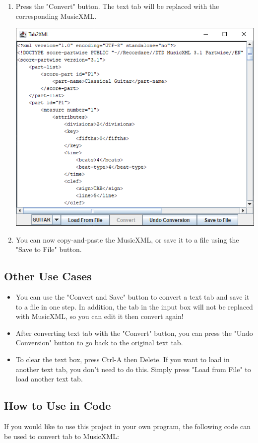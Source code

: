\documentclass[11pt]{article}
\begin{document}
\begin{enumerate}
\begin{center}
\end{center}
\item Press the "Convert" button.  The text tab will be replaced with the corresponding MusicXML.
\begin{center}
\includegraphics[width=.9\linewidth]{../Screenshots/converted-20210217.png}
\end{center}
\item You can now copy-and-paste the MusicXML, or save it to a file using the "Save to File" button.
\end{enumerate}
\subsection{Other Use Cases}
\label{sec:orge94bb2c}
\begin{itemize}
\item You can use the "Convert and Save" button to convert a text tab and save it to a file in one step.  In addition, the tab in the input box will not be replaced with MusicXML, so you can edit it then convert again!
\item After converting text tab with the "Convert" button, you can press the "Undo Conversion" button to go back to the original text tab.
\item To clear the text box, press Ctrl-A then Delete.  If you want to load in another text tab, you don't need to do this.  Simply press "Load from File" to load another text tab.
\end{itemize}
\subsection{How to Use in Code}
\label{sec:org81632bc}
If you would like to use this project in your own program, the following code can be used to convert tab to MusicXML:
\end{document}
